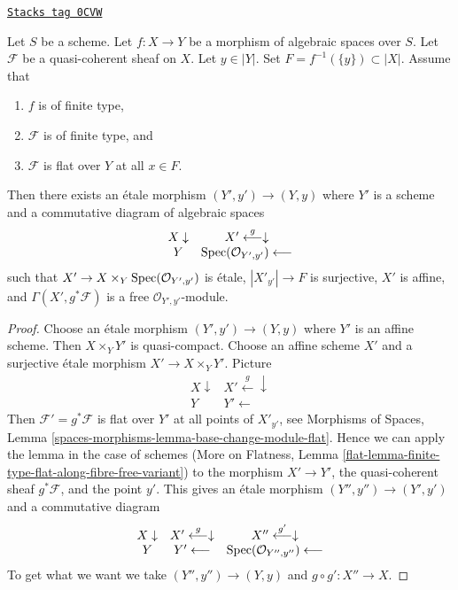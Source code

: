 \begin{lemma}
\label{spaces-flat-lemma-finite-type-flat-along-fibre-free-variant}
\href{https://stacks.math.columbia.edu/tag/0CVW}{\texttt{Stacks tag 0CVW}}

Let $S$ be a scheme. Let $f : X \to Y$ be a morphism of algebraic spaces
over $S$. Let $\mathcal{F}$ be a quasi-coherent sheaf on $X$.
Let $y \in |Y|$. Set $F = f^{-1}(\{y\}) \subset |X|$. Assume that
\begin{enumerate}
\item $f$ is of finite type,
\item $\mathcal{F}$ is of finite type, and
\item $\mathcal{F}$ is flat over $Y$ at all $x \in F$.
\end{enumerate}
Then there exists an \'etale morphism $(Y', y') \to (Y, y)$
where $Y'$ is a scheme and a commutative diagram of algebraic spaces
$$
\begin{array}{cc}X \downarrow & X' \overset{g}{\longleftarrow}\downarrow \\ Y & \operatorname{Spec}(\mathcal{O}_{Y', y'}) \longleftarrow\end{array}
$$
such that $X' \to X \times_Y \operatorname{Spec}(\mathcal{O}_{Y', y'})$
is \'etale, $|X'_{y'}| \to F$ is surjective, $X'$ is affine,
and $\Gamma(X', g^*\mathcal{F})$ is a free $\mathcal{O}_{Y', y'}$-module.
\end{lemma}

\begin{proof}
Choose an \'etale morphism $(Y', y') \to (Y, y)$ where $Y'$ is an
affine scheme. Then $X \times_Y Y'$ is quasi-compact.
Choose an affine scheme $X'$ and a surjective \'etale morphism
$X' \to X \times_Y Y'$. Picture
$$
\begin{array}{cc}X \downarrow & X' \overset{g}{\longleftarrow}\downarrow \\ Y & Y' \longleftarrow\end{array}
$$
Then $\mathcal{F}' = g^*\mathcal{F}$ is flat over $Y'$ at all
points of $X'_{y'}$, see Morphisms of Spaces, Lemma
\ref{spaces-morphisms-lemma-base-change-module-flat}.
Hence we can apply the lemma in the case of schemes
(More on Flatness, Lemma
\ref{flat-lemma-finite-type-flat-along-fibre-free-variant})
to the morphism
$X' \to Y'$, the quasi-coherent sheaf $g^*\mathcal{F}$, and the point $y'$.
This gives an \'etale morphism $(Y'', y'') \to (Y', y')$ and a commutative
diagram
$$
\begin{array}{ccc}X \downarrow & X' \overset{g}{\longleftarrow}\downarrow & X'' \overset{g'}{\longleftarrow}\downarrow \\ Y & Y' \longleftarrow & \operatorname{Spec}(\mathcal{O}_{Y'', y''}) \longleftarrow\end{array}
$$
To get what we want we take $(Y'', y'') \to (Y, y)$
and $g \circ g' : X'' \to X$.
\end{proof}

